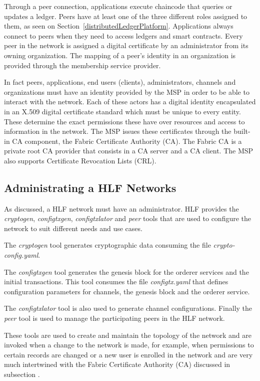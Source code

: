 Through a peer connection, applications execute chaincode that queries or
updates a ledger. Peers have at least one of the three different roles assigned
to them, as seen on Section~\ref{distributedLedgerPlatform}. Applications
always connect to peers when they need to access ledgers and smart contracts.
Every peer in the network is assigned a digital certificate by an administrator
from its owning organization. The mapping of a peer's identity in an
organization is provided through the membership service provider. 

In fact peers, applications, end users (clients), administrators, channels and
organizations must have an identity provided by the MSP in order to be able to
interact with the network. Each of these actors has a digital identity
encapsulated in an X.509 digital certificate standard which must be unique to
every entity. These determine the exact permissions these have over resources
and access to information in the network. The MSP issues these certificates
through the built-in CA component, the Fabric Certificate Authority (CA). The
Fabric CA is a private root CA provider that consists in a CA server and a CA
client. The MSP also supports Certificate Revocation Lists (CRL).

\subsection{Administrating a HLF Networks}


As discussed, a HLF network must have an administrator. HLF provides the
\textit{cryptogen}, \textit{configtxgen}, \textit{configtxlator} and
\textit{peer} tools that are used to configure the network to suit different
needs and use cases.

The \textit{cryptogen} tool generates cryptographic data consuming the file
\textit{crypto-config.yaml}.

The \textit{configtxgen} tool generates the genesis block for the orderer
services and the initial transactions.  This tool consumes the file
\textit{configtx.yaml} that defines configuration parameters for channels, the
genesis block and the orderer service.

The \textit{configtxlator} tool is also used to generate channel
configurations.  Finally the \textit{peer} tool is used to manage the
participating peers in the HLF network.

These tools are used to create and maintain the topology of the network and are
invoked when a change to the network is made, for example, when permissions to
certain records are changed or a new user is enrolled in the network and are
very much intertwined with the Fabric Certificate Authority (CA) discussed in
subsection .

